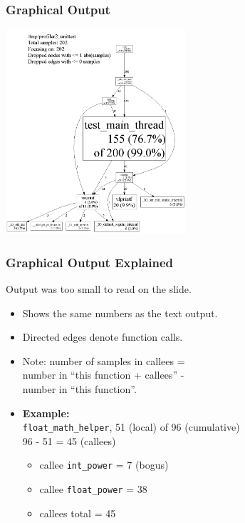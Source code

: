 \begin{frame}
  \frametitle{Graphical Output}

  \begin{center}
    \includegraphics[width=0.5\textwidth]{images/pprof-test-big.png}
  \end{center}
\end{frame}

\begin{frame}
  \frametitle{Graphical Output Explained}


\begin{changemargin}{1.5cm}
  
  Output was too small to read on the slide.

  \begin{itemize}
    \item Shows the same numbers as the text output.
    \item Directed edges denote function calls.
    \item Note: number of samples in callees = \\
      \qquad number in ``this function + callees'' - \\
      \qquad number in ``this function''.\\
    \item {\bf Example:}\\
{{\tt float\_math\_helper}, 51 (local) of 96 (cumulative)} \\
      96 - 51 = 45 (callees)
      \begin{itemize}
        \item callee {\tt int\_power} = 7 (bogus)
        \item callee {\tt float\_power} = 38
        \item callees total = 45
      \end{itemize}

  \end{itemize}
  \end{changemargin}
\end{frame}

